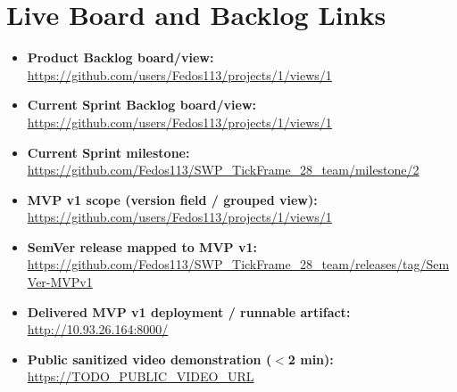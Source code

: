 \documentclass[11pt,a4paper]{article}
\begin{document}
\section{Live Board and Backlog Links}

\begin{itemize}[leftmargin=*]
    \item \textbf{Product Backlog board/view:} \\
          \url{https://github.com/users/Fedos113/projects/1/views/1}

    \item \textbf{Current Sprint Backlog board/view:} \\
          \url{https://github.com/users/Fedos113/projects/1/views/1}

    \item \textbf{Current Sprint milestone:} \\
          \url{https://github.com/Fedos113/SWP_TickFrame_28_team/milestone/2}

    \item \textbf{MVP v1 scope (version field / grouped view):} \\
          \url{https://github.com/users/Fedos113/projects/1/views/1}

    \item \textbf{SemVer release mapped to MVP v1:} \\
          \url{https://github.com/Fedos113/SWP_TickFrame_28_team/releases/tag/SemVer-MVPv1}

    \item \textbf{Delivered MVP v1 deployment / runnable artifact:} \\
          \url{http://10.93.26.164:8000/}

    \item \textbf{Public sanitized video demonstration ($<$2 min):} \\
          \url{https://TODO_PUBLIC_VIDEO_URL}
\end{itemize}
\end{document}
